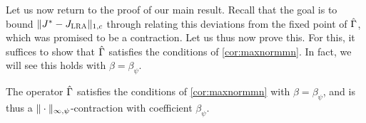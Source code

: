 \documentclass[12pt,draftcls,onecolumn]{IEEEtran}
\begin{document}
Let us now return to the proof of our main result. Recall that the goal is to bound
$\|J^*-J_{\text{\sc LRA}}\|_{1,c}$ through relating this deviations from the fixed point of $\hat{\Gamma}$, which was promised to be a contraction.
Let us thus now prove this.
For this, it suffices to show that $\hat{\Gamma}$ satisfies the conditions of \cref{cor:maxnormmn}.
In fact, we will see this holds with $\beta =\beta_\psi$.
\begin{proposition}\label{tgmonotone}\label{gshiftmn}
The operator $\hat{\Gamma}$ satisfies the conditions of \cref{cor:maxnormmn} with $\beta =\beta_\psi$, and is thus a
$\|\cdot\|_{\infty,\psi}$-contraction with coefficient $\beta_\psi$.
\end{proposition}
\end{document}
